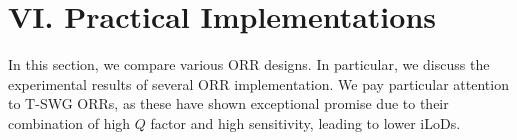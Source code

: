\documentclass[aps,prl,twocolumn, superscriptaddress,nobalancelastpage]{revtex4}
\begin{document}






\section{VI. Practical Implementations}
\vspace{-1em}


In this section, we compare various ORR designs. In particular, we discuss the experimental results of several ORR implementation. We pay particular attention to T-SWG ORRs, as these have shown exceptional promise due to their combination of high $Q$ factor and high sensitivity, leading to lower iLoDs.


\end{document}
